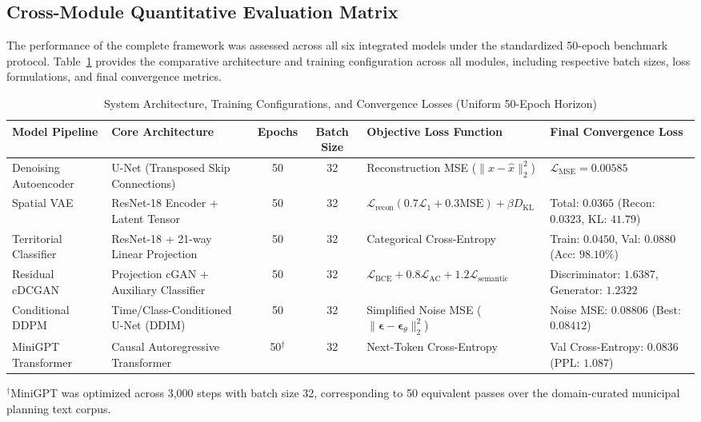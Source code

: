\documentclass[conference]{IEEEtran}
\begin{document}
\subsection{Cross-Module Quantitative Evaluation Matrix}

The performance of the complete framework was assessed across all six integrated models under the standardized 50-epoch benchmark protocol. Table~\ref{tab:model_specs} provides the comparative architecture and training configuration across all modules, including respective batch sizes, loss formulations, and final convergence metrics.

\begin{table}[!t]
\caption{System Architecture, Training Configurations, and Convergence Losses (Uniform 50-Epoch Horizon)}
\centering
\scriptsize
\setlength{\tabcolsep}{4pt}
\begin{tabularx}{\textwidth}{@{}l X c c X X@{}}
\toprule
\textbf{Model Pipeline} & \textbf{Core Architecture} & \textbf{Epochs} & \textbf{Batch Size} & \textbf{Objective Loss Function} & \textbf{Final Convergence Loss} \\
\midrule
Denoising Autoencoder & U-Net (Transposed Skip Connections) & 50 & 32 & Reconstruction MSE ($\|x - \hat{x}\|_2^2$) & $\mathcal{L}_{\text{MSE}} = 0.00585$ \\
Spatial VAE & ResNet-18 Encoder + Latent Tensor & 50 & 32 & $\mathcal{L}_{\text{recon}} (0.7\mathcal{L}_1 + 0.3\text{MSE}) + \beta D_{\text{KL}}$ & Total: $0.0365$ (Recon: $0.0323$, KL: $41.79$) \\
Territorial Classifier & ResNet-18 + 21-way Linear Projection & 50 & 32 & Categorical Cross-Entropy & Train: $0.0450$, Val: $0.0880$ (Acc: $98.10\%$) \\
Residual cDCGAN & Projection cGAN + Auxiliary Classifier & 50 & 32 & $\mathcal{L}_{\text{BCE}} + 0.8\mathcal{L}_{\text{AC}} + 1.2\mathcal{L}_{\text{semantic}}$ & Discriminator: $1.6387$, Generator: $1.2322$ \\
Conditional DDPM & Time/Class-Conditioned U-Net (DDIM) & 50 & 32 & Simplified Noise MSE ($\|\boldsymbol{\epsilon} - \boldsymbol{\epsilon}_\theta\|_2^2$) & Noise MSE: $0.08806$ (Best: $0.08412$) \\
MiniGPT Transformer & Causal Autoregressive Transformer & 50$^\dagger$ & 32 & Next-Token Cross-Entropy & Val Cross-Entropy: $0.0836$ (PPL: $1.087$) \\
\bottomrule
\end{tabularx}
\label{tab:model_specs}
\vspace{2pt}
\raggedright\scriptsize $^{\dagger}$MiniGPT was optimized across 3,000 steps with batch size 32, corresponding to 50 equivalent passes over the domain-curated municipal planning text corpus.\par
\end{table}
\end{document}
